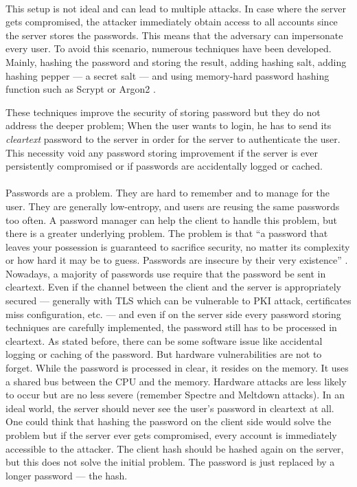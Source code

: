 ﻿\documentclass[../report.tex]{subfiles}
\begin{document}
\paragraph{}
This setup is not ideal and can lead to multiple attacks.
In case where the server gets compromised, the attacker immediately obtain access to all accounts since the server stores the passwords. This means that the adversary can impersonate every user.
To avoid this scenario, numerous techniques have been developed.
Mainly, hashing the password and storing the result, adding hashing salt, adding hashing pepper --- a secret salt --- and using memory-hard password hashing function such as Scrypt \cite{Scrypt_Paper} or Argon2 \cite{Argon2_Paper}.

These techniques improve the security of storing password but they do not address the deeper problem;
When the user wants to login, he has to send its \emph{cleartext} password to the server in order for the server to authenticate the user. This necessity void any password storing improvement if the server is ever persistently compromised or if passwords are accidentally logged or cached.

\paragraph{}
Passwords are a problem. They are hard to remember and to manage for the user. They are generally low-entropy, and users are reusing the same passwords too often. A password manager can help the client to handle this problem, but there is a greater underlying problem.
The problem is that ``a password that leaves your possession is guaranteed to sacrifice security, no matter its complexity or how hard it may be to guess. Passwords are insecure by their very existence'' \cite{PAKE_Cloudflare_blog}. %
Nowadays, a majority of passwords use require that the password be sent in cleartext.
Even if the channel between the client and the server is appropriately secured
--- generally with TLS which can be vulnerable to PKI attack, certificates miss configuration, etc. ---
and even if on the server side every password storing techniques are carefully implemented, the password still has to be processed in cleartext.
As stated before, there can be some software issue like accidental logging or caching of the password. But hardware vulnerabilities are not to forget. While the password is processed in clear, it resides on the memory. It uses a shared bus between the CPU and the memory. Hardware attacks are less likely to occur but are no less severe (remember Spectre \cite{Spectre_Paper} and Meltdown \cite{Meltdown_Paper} attacks).
In an ideal world, the server should never see the user's password in cleartext at all.
One could think that hashing the password on the client side would solve the problem but if the server ever gets compromised, every account is immediately accessible to the attacker. The client hash should be hashed again on the server, but this does not solve the initial problem. The password is just replaced by a longer password --- the hash.
\end{document}
